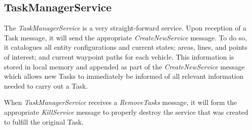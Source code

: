 \subsection{TaskManagerService}\label{taskmanagerservice}

The \emph{TaskManagerService} is a very straight-forward service. Upon
reception of a Task message, it will send the appropriate
\emph{CreateNewService} message. To do so, it catalogues all entity
configurations and current states; areas, lines, and points of interest;
and current waypoint paths for each vehicle. This information is stored
in local memory and appended as part of the \emph{CreateNewService}
message which allows new Tasks to immediately be informed of all
relevant information needed to carry out a Task.

When \emph{TaskManagerService} receives a \emph{RemoveTasks} message, it
will form the appropriate \emph{KillService} message to properly destroy
the service that was created to fulfill the original Task.

